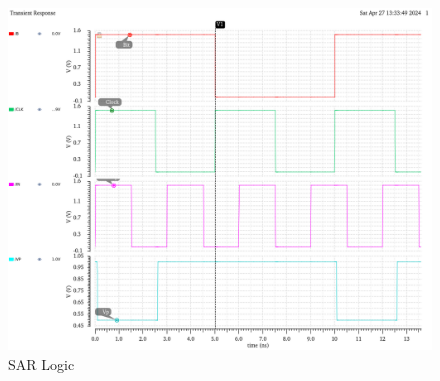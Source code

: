 \documentclass[a4paper,12pt]{article}
\begin{document}
\begin{figure}[H]
    \centering
    \includegraphics[max width = \textwidth]{3/3_CNTRL_LOGIC_NC.png}
    \caption{SAR Logic}
    \label{fig:enter-label}
\end{figure}
\end{document}
